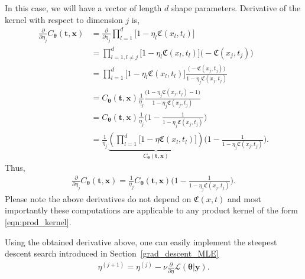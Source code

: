 \documentclass{iitthesis}          %
\newcommand{\bm}[1]{\boldsymbol{#1}}
\newcommand{\vtheta}{{\bm{\theta}}}
\newcommand{\vt}{\bm{t}}
\newcommand{\vx}{\bm{x}}
\newcommand{\vy}{\bm{y}}
\newcommand\secref{Section~\ref}
\begin{document}
In this case, we will have a vector of length $d$ shape parameters. Derivative of the kernel with respect to dimension $j$ is,
\begin{align*}
\frac{\partial}{\partial \eta_j} C_\vtheta(\vt, \vx) 
& =
\frac{\partial}{\partial \eta_j} 
\prod_{l=1}^d \biggl[
1 - \eta_l \mathfrak{C}(x_l,t_l) \biggr]
\\
& = 
\prod_{l=1, l \neq j}^d \biggl[
1 - \eta_l \mathfrak{C}(x_l,t_l) \biggr]
\biggl( - \mathfrak{C}(x_j,t_j) \biggr)
\\
& =
\prod_{l=1}^d \biggl[
1 - \eta_l \mathfrak{C}(x_l,t_l) \biggr]
\frac{
	\biggl( - \mathfrak{C}(x_j,t_j) \biggr)
}{
	1 - \eta_j \mathfrak{C}(x_j,t_j) 
}
\\
& =
C_\vtheta(\vt, \vx) 
\frac{1}{\eta_j}
\frac{
	\biggl(1 - \eta_j \mathfrak{C}(x_j,t_j)  - 1 \biggr)
}{
	1 - \eta_j \mathfrak{C}(x_j,t_j) 
}
\\
& =
C_\vtheta(\vt, \vx) 
\frac{1}{\eta_j}
\biggl(
1 - 
\frac{1
}{
	1 - \eta_j \mathfrak{C}(x_j,t_j) 
}
\biggr)
\\
& =
\frac{1}{\eta_j} 
\underbrace{
	\left(
	\prod_{l=1}^d \biggl[
	1 - \eta \mathfrak{C}(x_l,t_l) \biggr]
	\right) }_
{ C_\vtheta(\vt, \vx) }
\biggl(
1 - 
\frac{1}
{ 1 - \eta_j \mathfrak{C}(x_j,t_j) }
\biggr) 
.
\end{align*}
Thus, 
\begin{align*}
\frac{\partial}{\partial \eta_j} C_\vtheta(\vt, \vx) = \frac{1}{\eta_j} 
{ C_\vtheta(\vt, \vx) }
\biggl(
1 - 
\frac{1}
{ 1 - \eta_j \mathfrak{C}(x_j,t_j) }
\biggr).
\end{align*}
Please note the above derivatives do not depend on $\mathfrak{C}(x,t)$ and most importantly these computations are applicable to any product kernel of the form \eqref{eqn:prod_kernel}.

Using the obtained derivative above, one can easily implement the steepest descent search introduced in \secref{grad_descent_MLE} 
\begin{align*}
\eta^{(j+1)} = \eta^{(j)} - \nu \frac{\partial}{\partial \eta} \mathcal{L}(\vtheta | \vy).
\end{align*}






\iftrue
\end{document}
